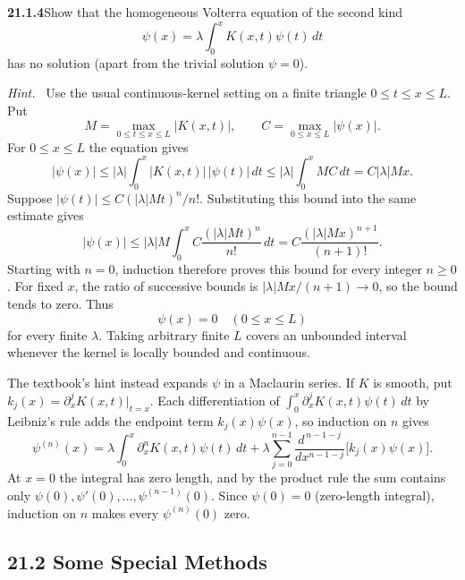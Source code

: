 \par\bigskip
\noindent\textbf{21.1.4}\quad Show that the homogeneous Volterra
equation of the second kind
\[
\psi(x)=\lambda\int_{0}^{x}K(x,t)\psi(t)\,dt
\]
has no solution (apart from the trivial solution $\psi=0$).
\par\emph{Hint.}~
\solution
Use the usual continuous-kernel setting on a finite triangle
$0\le t\le x\le L$. Put
\[
M=\max_{0\le t\le x\le L}|K(x,t)|,\qquad
C=\max_{0\le x\le L}|\psi(x)|.
\]
For $0\le x\le L$ the equation gives
\[
|\psi(x)|\le|\lambda|\int_0^x|K(x,t)|\,|\psi(t)|\,dt
\le|\lambda|\int_0^xMC\,dt=C|\lambda|Mx.
\]
Suppose $|\psi(t)|\le C(|\lambda|Mt)^n/n!$. Substituting this
bound into the same estimate gives
\[
|\psi(x)|\le|\lambda|M\int_0^x
C\frac{(|\lambda|Mt)^n}{n!}\,dt
=C\frac{(|\lambda|Mx)^{n+1}}{(n+1)!}.
\]
Starting with $n=0$, induction therefore proves this bound for every
integer $n\ge0$. For fixed $x$, the ratio of successive bounds is
$|\lambda|Mx/(n+1)\to0$, so the bound tends to zero. Thus
\[
\boxed{\psi(x)=0\quad(0\le x\le L)}
\]
for every finite $\lambda$. Taking arbitrary finite $L$ covers an
unbounded interval whenever the kernel is locally bounded and continuous.

The textbook's hint instead expands $\psi$ in a Maclaurin series.
If $K$ is smooth, put $k_j(x)=\partial_x^jK(x,t)\big|_{t=x}$.
Each differentiation of $\int_0^x\partial_x^jK(x,t)\psi(t)\,dt$ by
Leibniz's rule adds the endpoint term $k_j(x)\psi(x)$, so induction on
$n$ gives
\[
\psi^{(n)}(x)=\lambda\int_0^x\partial_x^nK(x,t)\psi(t)\,dt
+\lambda\sum_{j=0}^{n-1}\frac{d^{\,n-1-j}}{dx^{n-1-j}}
\bigl[k_j(x)\psi(x)\bigr].
\]
At $x=0$ the integral has zero length, and by the product rule the sum
contains only $\psi(0),\psi'(0),\ldots,\psi^{(n-1)}(0)$. Since
$\psi(0)=0$ (zero-length integral), induction on $n$ makes every
$\psi^{(n)}(0)$ zero.


\subsection*{21.2 Some Special Methods}

